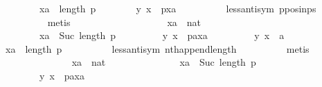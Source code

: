 \begin{isabellebody}
\ \ \ \ \ \ \ \ {\isachardoublequoteopen}xa\ {\isasymnoteq}\ length\ p{\isachardoublequoteclose}\isanewline
\ \ \ \ \ \ \isamarkupfalse%
\ {\isachardoublequoteopen}{\isacharparenleft}{\kern0pt}y{\isacharcomma}{\kern0pt}\ x{\isacharparenright}{\kern0pt}\ {\isasymin}\ p{\isacharbang}{\kern0pt}xa{\isachardoublequoteclose}\isanewline
\ \ \ \ \ \ \ \ \isamarkupfalse%
\ less{\isacharunderscore}{\kern0pt}antisym\ p{\isacharunderscore}{\kern0pt}pos{\isacharunderscore}{\kern0pt}in{\isacharunderscore}{\kern0pt}ps\isanewline
\ \ \ \ \ \ \ \ \isamarkupfalse%
\ metis\isanewline
\ \ \ \ \isamarkupfalse%
\isanewline
\ \ \ \ \ \ \isamarkupfalse%
\isanewline
\ \ \ \ \ \ \ \ xa\ {\isacharcolon}{\kern0pt}{\isacharcolon}{\kern0pt}\ nat\isanewline
\ \ \ \ \ \ \isamarkupfalse%
\isanewline
\ \ \ \ \ \ \ \ {\isachardoublequoteopen}xa\ {\isacharless}{\kern0pt}\ Suc\ {\isacharparenleft}{\kern0pt}length\ p{\isacharparenright}{\kern0pt}{\isachardoublequoteclose}\ \isanewline
\ \ \ \ \ \ \ \ {\isachardoublequoteopen}{\isacharparenleft}{\kern0pt}y{\isacharcomma}{\kern0pt}\ x{\isacharparenright}{\kern0pt}\ {\isasymin}\ {\isacharparenleft}{\kern0pt}p{\isacharat}{\kern0pt}{\isacharbrackleft}{\kern0pt}a{\isacharbrackright}{\kern0pt}{\isacharparenright}{\kern0pt}{\isacharbang}{\kern0pt}xa{\isachardoublequoteclose}\ \isanewline
\ \ \ \ \ \ \ \ {\isachardoublequoteopen}{\isacharparenleft}{\kern0pt}y{\isacharcomma}{\kern0pt}\ x{\isacharparenright}{\kern0pt}\ {\isasymnotin}\ a{\isachardoublequoteclose}\isanewline
\ \ \ \ \ \ \isamarkupfalse%
\ {\isachardoublequoteopen}xa\ {\isacharless}{\kern0pt}\ length\ p{\isachardoublequoteclose}\isanewline
\ \ \ \ \ \ \ \ \isamarkupfalse%
\ less{\isacharunderscore}{\kern0pt}antisym\ nth{\isacharunderscore}{\kern0pt}append{\isacharunderscore}{\kern0pt}length\isanewline
\ \ \ \ \ \ \ \ \isamarkupfalse%
\ metis\isanewline
\ \ \ \ \isamarkupfalse%
\isanewline
\ \ \ \ \ \ \isamarkupfalse%
\isanewline
\ \ \ \ \ \ \ \ xa\ {\isacharcolon}{\kern0pt}{\isacharcolon}{\kern0pt}\ nat\isanewline
\ \ \ \ \ \ \isamarkupfalse%
\isanewline
\ \ \ \ \ \ \ \ {\isachardoublequoteopen}xa\ {\isacharless}{\kern0pt}\ Suc\ {\isacharparenleft}{\kern0pt}length\ p{\isacharparenright}{\kern0pt}{\isachardoublequoteclose}\ \isanewline
\ \ \ \ \ \ \ \ {\isachardoublequoteopen}{\isacharparenleft}{\kern0pt}y{\isacharcomma}{\kern0pt}\ x{\isacharparenright}{\kern0pt}\ {\isasymin}\ {\isacharparenleft}{\kern0pt}p{\isacharat}{\kern0pt}{\isacharbrackleft}{\kern0pt}a{\isacharbrackright}{\kern0pt}{\isacharparenright}{\kern0pt}{\isacharbang}{\kern0pt}xa{\isachardoublequoteclose}\ \isanewline

\end{isabellebody}
